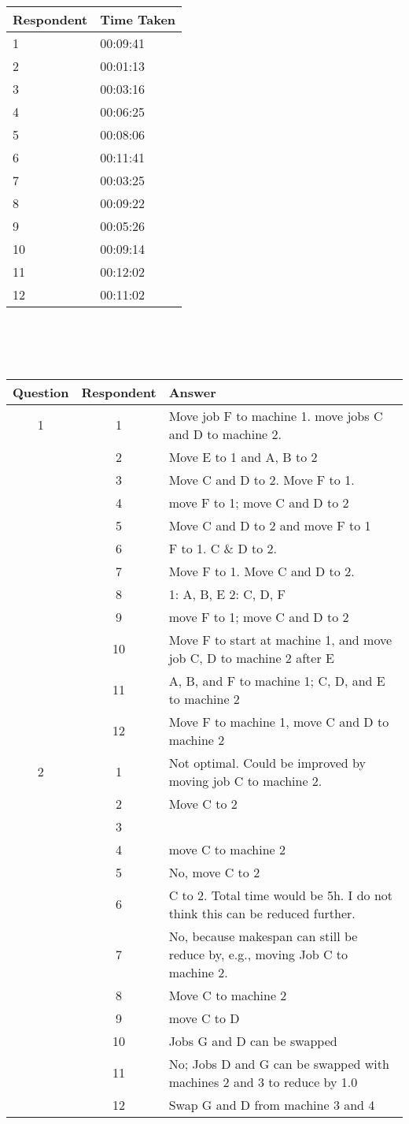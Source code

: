 \begin{tabular}{l l}
	\hline
	Respondent & Time Taken \\
	\hline
	1 & 00:09:41 \\
	2 & 00:01:13 \\
	3 & 00:03:16 \\
	4 & 00:06:25 \\
	5 & 00:08:06 \\
	6 & 00:11:41 \\
	7 & 00:03:25 \\
	8 & 00:09:22 \\
	9 & 00:05:26 \\
	10 & 00:09:14 \\
	11 & 00:12:02 \\
	12 & 00:11:02 \\
	\hline
\end{tabular}
\\\\\\
\begin{tabularx}{\linewidth}{c c X}
	\hline
	Question & Respondent & Answer \\
	\hline
	1 & 1 & Move job F to machine 1. move jobs C and D to machine 2. \\
	& 2 & Move E to 1 and A, B to 2 \\
	& 3 & Move C and D to 2. Move F to 1. \\
	& 4 & move F to 1; move C and D to 2 \\
	& 5 & Move C and D to 2 and move F to 1 \\
	& 6 & F to 1. C \& D to 2. \\
	& 7 & Move F to 1. Move C and D to 2. \\
	& 8 & 1: A, B, E 2: C, D, F \\
	& 9 & move F to 1; move C and D to 2 \\
	& 10 & Move F to start at machine 1, and move job C, D to machine 2 after E \\
	& 11 & A, B, and F to machine 1; C, D, and E to machine 2 \\
	& 12 & Move F to machine 1, move C and D to machine 2 \\
	\hline
	2 & 1 & Not optimal. Could be improved by moving job C to machine 2. \\
	& 2 & Move C to 2 \\
	& 3 &  \\
	& 4 & move C to machine 2 \\
	& 5 & No, move C to 2 \\
	& 6 & C to 2. Total time would be 5h. I do not think this can be reduced further. \\
	& 7 & No, because makespan can still be reduce by, e.g., moving Job C to machine 2. \\
	& 8 & Move C to machine 2 \\
	& 9 & move C to D \\
	& 10 & Jobs G and D can be swapped \\
	& 11 & No; Jobs D and G can be swapped with machines 2 and 3 to reduce by 1.0 \\
	& 12 & Swap G and D from machine 3 and 4 \\
	\hline
\end{tabularx}
